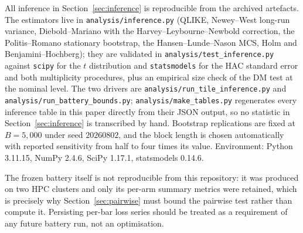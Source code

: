 All inference in Section~\ref{sec:inference} is reproducible from the archived
artefacts. The estimators live in \texttt{analysis/inference.py} (QLIKE,
Newey--West long-run variance, Diebold--Mariano with the
Harvey--Leybourne--Newbold correction, the Politis--Romano stationary
bootstrap, the Hansen--Lunde--Nason MCS, Holm and Benjamini--Hochberg); they
are validated in \texttt{analysis/test\_inference.py} against
\texttt{scipy} for the $t$ distribution and \texttt{statsmodels} for the HAC
standard error and both multiplicity procedures, plus an empirical size check
of the DM test at the nominal level. The two drivers are
\texttt{analysis/run\_tile\_inference.py} and
\texttt{analysis/run\_battery\_bounds.py}; \texttt{analysis/make\_tables.py}
regenerates every inference table in this paper directly from their JSON
output, so no statistic in Section~\ref{sec:inference} is transcribed by hand.
Bootstrap replications are fixed at $B = 5{,}000$ under seed $20260802$, and
the block length is chosen automatically with reported sensitivity from half to
four times its value. Environment: Python 3.11.15, NumPy 2.4.6, SciPy 1.17.1,
statsmodels 0.14.6.

The frozen battery itself is not reproducible from this repository: it was
produced on two HPC clusters and only its per-arm summary metrics were
retained, which is precisely why Section~\ref{sec:pairwise} must bound the
pairwise test rather than compute it. Persisting per-bar loss series should be
treated as a requirement of any future battery run, not an optimisation.
